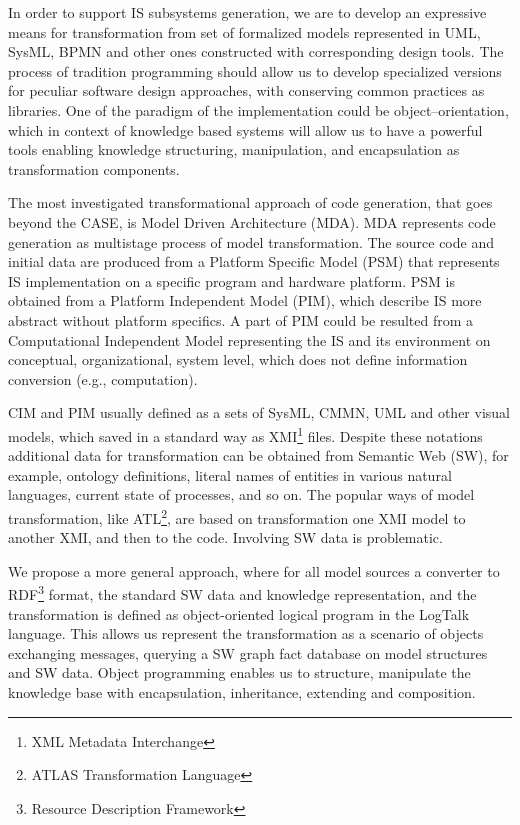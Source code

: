 \documentclass[conference]{IEEEtran}
\begin{document}
In order to support IS subsystems generation, we are to develop an expressive means for transformation from set of formalized models represented in UML, SysML, BPMN and other ones constructed with corresponding design tools.  The process of tradition programming should allow us to develop specialized versions for peculiar software design approaches, with conserving common practices as libraries.  One of the paradigm of the implementation could be object--orientation, which in context of knowledge based systems will allow us to have a powerful tools enabling knowledge structuring, manipulation, and encapsulation as transformation components.  %

The most investigated transformational approach of code generation, that goes beyond the CASE, is Model Driven Architecture (MDA).  MDA represents code generation as multistage process of model transformation.  The source code and initial data are produced from a Platform Specific Model (PSM) that represents IS implementation on a specific program and hardware platform.  PSM is obtained from a Platform Independent Model (PIM), which describe IS more abstract without platform specifics.  A part of PIM could be resulted from a Computational Independent Model representing the IS and its environment on conceptual, organizational, system level, which does not define information conversion (e.g., computation).

CIM and PIM usually defined as a sets of SysML, CMMN, UML and other visual models, which saved in a standard way as XMI\footnote{XML Metadata Interchange} files.  Despite these notations additional data for transformation can be obtained from Semantic Web (SW), for example, ontology definitions, literal names of entities in various natural languages, current state of processes, and so on.  The popular ways of model transformation, like ATL\footnote{ATLAS Transformation Language}, are based on transformation one XMI model to another XMI, and then to the code.  Involving SW data is problematic.

We propose a more general approach, where for all model sources a converter to RDF\footnote{Resource Description Framework} format, the standard SW data and knowledge representation, and the transformation is defined as object-oriented logical program in the LogTalk language.  This allows us represent the transformation as a scenario of objects exchanging messages, querying a SW graph fact database on model structures and SW data.  Object programming enables us to structure, manipulate the knowledge base with encapsulation, inheritance, extending and composition.
\end{document}

